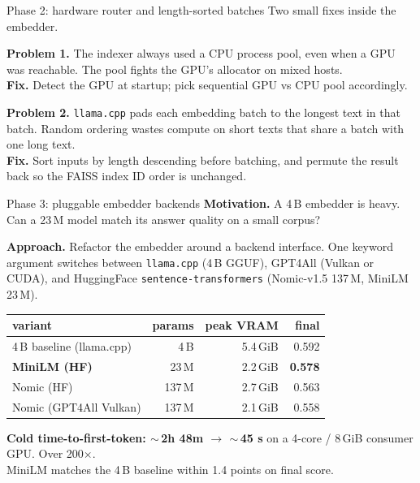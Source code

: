 \documentclass[aspectratio=169,11pt]{beamer}
\begin{document}
\begin{frame}{Phase 2: hardware router and length-sorted batches}
Two small fixes inside the embedder.

\bigskip

\textbf{Problem 1.} The indexer always used a CPU process pool, even
when a GPU was reachable. The pool fights the GPU's allocator on
mixed hosts.\\
\textbf{Fix.} Detect the GPU at startup; pick sequential GPU vs CPU
pool accordingly.

\bigskip

\textbf{Problem 2.} \texttt{llama.cpp} pads each embedding batch to the
longest text in that batch. Random ordering wastes compute on short
texts that share a batch with one long text.\\
\textbf{Fix.} Sort inputs by length descending before batching, and
permute the result back so the FAISS index ID order is unchanged.

\end{frame}

\begin{frame}{Phase 3: pluggable embedder backends}
\textbf{Motivation.} A 4\,B embedder is heavy. Can a 23\,M model match
its answer quality on a small corpus?

\medskip

\textbf{Approach.} Refactor the embedder around a backend interface.
One keyword argument switches between \texttt{llama.cpp} (4\,B GGUF),
GPT4All (Vulkan or CUDA), and HuggingFace
\texttt{sentence-transformers} (Nomic-v1.5 137\,M, MiniLM 23\,M).

\medskip

\centering
\footnotesize
\begin{tabular}{lrrr}
\toprule
variant            & params  & peak VRAM  & final \\
\midrule
4\,B baseline (llama.cpp) & 4\,B    & 5.4\,GiB   & 0.592 \\
\textbf{MiniLM (HF)}      & 23\,M   & 2.2\,GiB   & \textbf{0.578} \\
Nomic (HF)                & 137\,M  & 2.7\,GiB   & 0.563 \\
Nomic (GPT4All Vulkan)    & 137\,M  & 2.1\,GiB   & 0.558 \\
\bottomrule
\end{tabular}

\vspace{1ex}
\begin{block}{}
\centering
\textbf{Cold time-to-first-token: $\sim$\,2h 48m $\rightarrow$
$\sim$\,45 s} on a 4-core / 8\,GiB consumer GPU. Over 200$\times$.
\\[0.4ex]
MiniLM matches the 4\,B baseline within 1.4 points on final score.
\end{block}

\end{frame}
\end{document}

